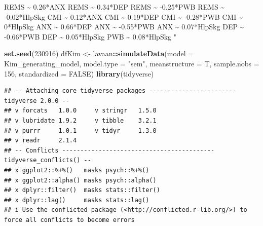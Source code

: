 \documentclass[
  11pt,
]{book}
\newenvironment{Shaded}{\begin{snugshade}}{\end{snugshade}}
\newcommand{\AttributeTok}[1]{\textcolor[rgb]{0.27,0.27,0.27}{#1}}
\newcommand{\ConstantTok}[1]{\textcolor[rgb]{0.37,0.37,0.37}{#1}}
\newcommand{\DecValTok}[1]{\textcolor[rgb]{0.06,0.06,0.06}{#1}}
\newcommand{\FunctionTok}[1]{\textcolor[rgb]{0.27,0.27,0.27}{\textbf{#1}}}
\newcommand{\NormalTok}[1]{#1}
\newcommand{\OtherTok}[1]{\textcolor[rgb]{0.37,0.37,0.37}{#1}}
\newcommand{\SpecialCharTok}[1]{\textcolor[rgb]{0.43,0.43,0.43}{\textbf{#1}}}
\newcommand{\StringTok}[1]{\textcolor[rgb]{0.5,0.5,0.5}{#1}}
\begin{document}
\begin{Shaded}
\begin{Highlighting}[]
\StringTok{         REMS \textasciitilde{} 0.26*ANX}
\StringTok{         REMS \textasciitilde{} 0.34*DEP}
\StringTok{         REMS \textasciitilde{} {-}0.25*PWB}
\StringTok{         REMS \textasciitilde{} {-}0.02*HlpSkg}
\StringTok{         CMI \textasciitilde{} 0.12*ANX}
\StringTok{         CMI \textasciitilde{} 0.19*DEP}
\StringTok{         CMI \textasciitilde{} {-}0.28*PWB}
\StringTok{         CMI \textasciitilde{} 0*HlpSkg}
\StringTok{         ANX \textasciitilde{} 0.66*DEP}
\StringTok{         ANX \textasciitilde{} {-}0.55*PWB}
\StringTok{         ANX \textasciitilde{} 0.07*HlpSkg}
\StringTok{         DEP \textasciitilde{} {-}0.66*PWB}
\StringTok{         DEP \textasciitilde{} 0.05*HlpSkg}
\StringTok{         PWB \textasciitilde{} 0.08*HlpSkg}
\StringTok{        "}

\FunctionTok{set.seed}\NormalTok{(}\DecValTok{230916}\NormalTok{)}
\NormalTok{dfKim }\OtherTok{\textless{}{-}}\NormalTok{ lavaan}\SpecialCharTok{::}\FunctionTok{simulateData}\NormalTok{(}\AttributeTok{model =}\NormalTok{ Kim\_generating\_model, }\AttributeTok{model.type =} \StringTok{"sem"}\NormalTok{,}
    \AttributeTok{meanstructure =}\NormalTok{ T, }\AttributeTok{sample.nobs =} \DecValTok{156}\NormalTok{, }\AttributeTok{standardized =} \ConstantTok{FALSE}\NormalTok{)}
\FunctionTok{library}\NormalTok{(tidyverse)}
\end{Highlighting}
\end{Shaded}

\begin{verbatim}
## -- Attaching core tidyverse packages ------------------------ tidyverse 2.0.0 --
## v forcats   1.0.0     v stringr   1.5.0
## v lubridate 1.9.2     v tibble    3.2.1
## v purrr     1.0.1     v tidyr     1.3.0
## v readr     2.1.4     
## -- Conflicts ------------------------------------------ tidyverse_conflicts() --
## x ggplot2::%+%()   masks psych::%+%()
## x ggplot2::alpha() masks psych::alpha()
## x dplyr::filter()  masks stats::filter()
## x dplyr::lag()     masks stats::lag()
## i Use the conflicted package (<http://conflicted.r-lib.org/>) to force all conflicts to become errors
\end{verbatim}
\end{document}

